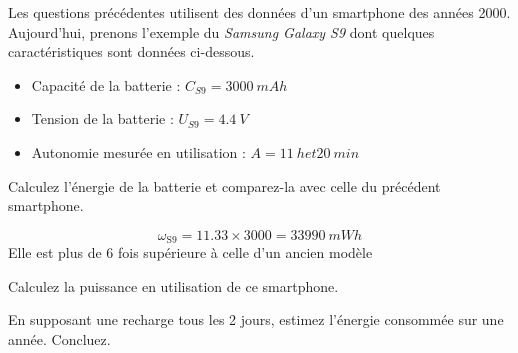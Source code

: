 \documentclass[10pt,fleqn]{article} %
\begin{document}
\begin{exercise}
Les questions précédentes utilisent des données d'un smartphone des années 2000. 
Aujourd'hui, prenons l'exemple du \textit{Samsung Galaxy S9} dont quelques 
caractéristiques sont données ci-dessous. 

\begin{itemize}
  \item Capacité de la batterie : $C_{S9} = \SI{3000}{mAh}$
  \item Tension de la batterie : $U_{S9} = \SI{4.4}{V}$
  \item Autonomie mesurée en utilisation : $A = \SI{11}{h} et \SI{20}{min}$
\end{itemize}
\begin{question}
  Calculez l'énergie de la batterie et comparez-la avec celle du précédent 
  smartphone.
\end{question}
\begin{solution}
  $$\omega_\text{S9} = 11.33 \times 3000 = \SI{33990}{mWh}$$
  Elle est plus de 6 fois supérieure à celle d'un ancien modèle
\end{solution}

\begin{question}
  Calculez la puissance en utilisation de ce smartphone.
\end{question}

\begin{question}
  En supposant une recharge tous les 2 jours, estimez l'énergie consommée sur 
  une année. Concluez. 
\end{question}
\end{exercise}
\end{document}

